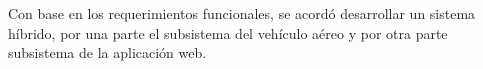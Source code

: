 
Con base en los requerimientos funcionales, se acordó desarrollar un sistema 
híbrido, por una parte el subsistema del vehículo aéreo y por otra parte 
subsistema de la aplicación web.
